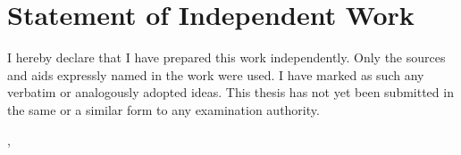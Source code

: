 
\section*{Statement of Independent Work}

I hereby declare that I have prepared this work independently. Only the sources and aids expressly named in the work were used. I have marked as such any verbatim or analogously adopted ideas. This thesis has not yet been submitted in the same or a similar form to any examination authority.

\vspace{20mm}

\ort, \abgabedatum
\vspace{5mm}

\underline{\hspace{8cm}}\\\dokumentenautor